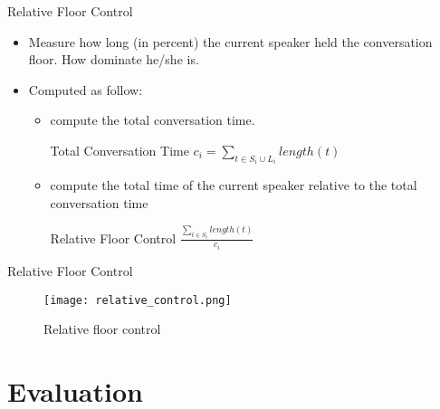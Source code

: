 \documentclass[t]{beamer}
\begin{document}
\begin{frame} {Relative Floor Control}
\begin{itemize}
    \item Measure how long (in percent) the current speaker held the conversation floor. How dominate he/she is.
    \item Computed as follow:
         \begin{itemize}
              \item compute the total conversation time.
                 \begin{block} {Total Conversation Time}
                       $c_i = \sum_{t \in S_i \cup L_i} length(t)$
                 \end{block}
             \item  compute the total time of the current speaker relative to the total conversation time
                 \begin{block}{Relative Floor Control}
                     $\frac{\sum_{t \in S_i} length(t)} {c_i}$
                 \end{block}
         \end{itemize}
 \end{itemize}        
\end{frame}        

\begin{frame} {Relative Floor Control}
\begin{figure}[ht!]
\centering
 \texttt{[image: relative\_control.png]}
 \caption{Relative floor control\label{overflow}}
 \end{figure}
\end{frame}



\section{Evaluation}

\end{document}

